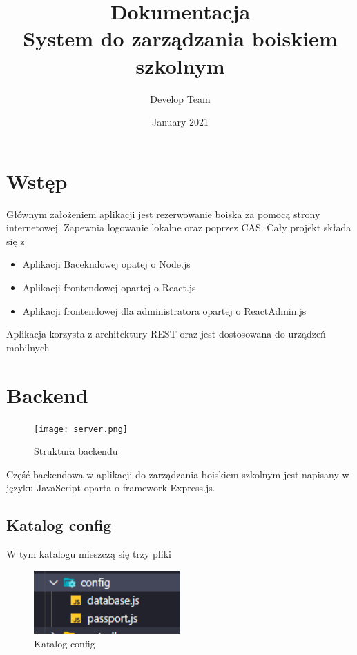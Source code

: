 \documentclass[titlepage]{article}
\title{
  \textbf{Dokumentacja} \\
  System do zarządzania boiskiem szkolnym}
\date{January 2021}
\author{Develop Team}
\begin{document}
\maketitle
\tableofcontents
\section*{Wstęp}

Głównym założeniem  aplikacji jest rezerwowanie boiska za pomocą strony internetowej. Zapewnia logowanie lokalne oraz  poprzez CAS. Cały projekt składa się z 
\begin{itemize}
  \item Aplikacji Bacekndowej opatej o Node.js
  \item Aplikacji frontendowej opartej o React.js
  \item Aplikacji frontendowej dla administratora opartej o ReactAdmin.js
\end{itemize}

Aplikacja korzysta z architektury REST oraz jest dostosowana do urządzeń mobilnych

\newpage
\section{Backend}

\begin{figure}[h]
\centering
\texttt{[image: server.png]}
\caption{Struktura backendu}
\label{fig:obrazek struktura}
\end{figure}

\indent Część backendowa w aplikacji do zarządzania boiskiem szkolnym jest napisany w języku JavaScript oparta o framework Express.js.


\subsection{Katalog config}
W tym katalogu mieszczą się trzy pliki
\begin{figure}[h]
\centering
\includegraphics[width=0.5\textwidth]{config.png}
\caption{Katalog config}
\label{fig:obrazek config}
\end{figure}
\end{document}
